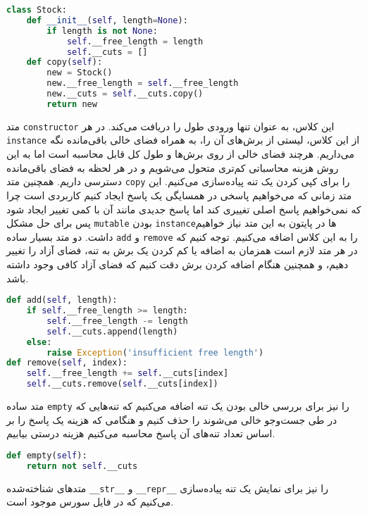 \documentclass[a4paper, 12pt]{article}
\begin{document}
\LTR
\begin{lstlisting}[language=Python]
class Stock:
    def __init__(self, length=None):
        if length is not None:
            self.__free_length = length
            self.__cuts = []
    def copy(self):
        new = Stock()
        new.__free_length = self.__free_length
        new.__cuts = self.__cuts.copy()
        return new
\end{lstlisting}
\RTL

متد
\texttt{constructor}
این کلاس، به عنوان تنها ورودی طول را دریافت می‌کند. در هر
\texttt{instance}
از این کلاس، لیستی از برش‌های آن را، به همراه فضای خالی باقی‌مانده نگه می‌داریم. هرچند فضای خالی از روی برش‌ها و طول کل قابل محاسبه است اما به این روش هزینه محاسباتی کم‌تری متحول می‌شویم و در هر لحظه به فضای باقی‌مانده دسترسی داریم. همچنین متد
\texttt{copy}
را برای کپی کردن یک تنه پیاده‌سازی می‌کنیم. این متد زمانی که می‌خواهیم پاسخی در همسایگی یک پاسخ ایجاد کنیم کاربردی است چرا که نمی‌خواهیم پاسخ اصلی تغییری کند اما پاسخ جدیدی مانند آن با کمی تغییر ایجاد شود پس برای حل مشکل
\texttt{mutable}
بودن
\texttt{instance}ها
در پایتون به این متد نیاز خواهیم داشت. دو متد بسیار ساده
\texttt{add}
و
\texttt{remove}
را به این کلاس اضافه می‌کنیم. توجه کنیم که در هر متد لازم است همزمان به اضافه یا کم کردن یک برش به تنه، فضای آزاد را تغییر دهیم، و همچنین هنگام اضافه کردن برش دقت کنیم که فضای آزاد کافی وجود داشته باشد.

\LTR
\begin{lstlisting}[language=Python]
def add(self, length):
    if self.__free_length >= length:
        self.__free_length -= length
        self.__cuts.append(length)
    else:
        raise Exception('insufficient free length')
def remove(self, index):
    self.__free_length += self.__cuts[index]
    self.__cuts.remove(self.__cuts[index])
\end{lstlisting}
\RTL

متد ساده
\texttt{empty}
را نیز برای بررسی خالی بودن یک تنه اضافه می‌کنیم که تنه‌هایی که در طی جست‌وجو خالی می‌شوند را حذف کنیم و هنگامی که هزینه یک پاسخ را بر اساس تعداد تنه‌های آن پاسخ محاسبه می‌کنیم هزینه درستی بیابیم.

\LTR
\begin{lstlisting}[language=Python]
def empty(self):
    return not self.__cuts
\end{lstlisting}
\RTL

متدهای شناخته‌شده
\texttt{\_\_str\_\_}
و
\texttt{\_\_repr\_\_}
را نیز برای نمایش یک تنه پیاده‌سازی می‌کنیم که در فایل سورس موجود است.

\newpage
\end{document}
